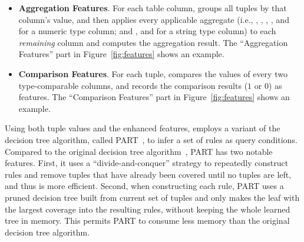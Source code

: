 \begin{itemize}

\item {\textbf{Aggregation Features}}. For each table column,
\ourtool groups all tuples by that column's value,
and then applies every applicable aggregate (i.e.,
, , ,
, and  for a numeric type column;
and , and  for a string type column) to each
 \textit{remaining} column and computes the aggregation result. 
The ``Aggregation Features'' part in Figure~\ref{fig:features}
shows an example.

\item {\textbf{Comparison Features}}. For each tuple, \ourtool compares
the values of every two type-comparable columns, and records
the comparison results ($1$ or $0$) as features.
The ``Comparison Features'' part in Figure~\ref{fig:features}
shows an example.

\end{itemize}



Using both tuple values and the enhanced features,
\ourtool employs a variant of the decision tree algorithm,
called PART~\cite{Frank:1998}, to infer a set of rules
as query conditions.
Compared to the original decision tree algorithm~\cite{},
PART has two notable features.
First, it uses a ``divide-and-conquer'' strategy to repeatedly
construct rules and remove tuples that have already been covered until
no tuples are left, and thus is more efficient.
Second, when constructing each rule, PART uses a pruned decision
tree built from current set of tuples and only makes the leaf with
the largest coverage into the resulting rules, without keeping
the whole learned tree in memory.
This permits PART to consume less memory than the original decision
tree algorithm.




